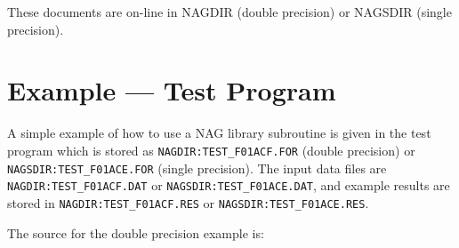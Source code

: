 These documents are on-line in NAGDIR (double precision) or NAGSDIR (single
precision).

\appendix

\newpage
\section{Example --- Test Program}
\label{se:exa}

A simple example of how to use a NAG library subroutine is given in the test
program which is stored as {\tt NAGDIR:TEST\_F01ACF.FOR} (double precision) or 
{\tt NAGSDIR:TEST\_F01ACE.FOR} (single precision). The input data files are
{\tt NAGDIR:TEST\_F01ACF.DAT} or  {\tt NAGSDIR:TEST\_F01ACE.DAT}, and example
results are stored in {\tt NAGDIR:TEST\_F01ACF.RES} or 
{\tt NAGSDIR:TEST\_F01ACE.RES}.

The source for the double precision example is:

